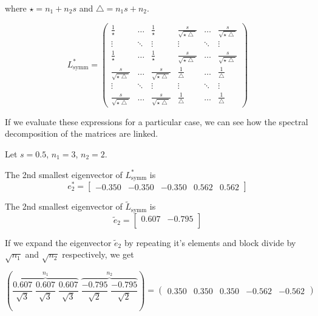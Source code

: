 where $\star = n_1 + n_2s$ and $\bigtriangleup = n_1s + n_2$.

\[ L_{\text{symm}}^* = \left(
  \begin{array}{cccccc}
    \frac{1}{\star} & \hdots & \frac{1}{\star} & \frac{s}{\sqrt{\star \bigtriangleup}} & \hdots & \frac{s}{\sqrt{\star \bigtriangleup}} \\
    \vdots & \ddots & \vdots & \vdots & \ddots & \vdots \\
    \frac{1}{\star} & \hdots & \frac{1}{\star} & \frac{s}{\sqrt{\star \bigtriangleup}} & \hdots & \frac{s}{\sqrt{\star \bigtriangleup}} \\
   \frac{s}{\sqrt{\star \bigtriangleup}} & \hdots & \frac{s}{\sqrt{\star \bigtriangleup}} & \frac{1}{\bigtriangleup}  & \hdots &  \frac{1}{\bigtriangleup} \\
    \vdots & \ddots & \vdots & \vdots & \ddots & \vdots \\
    \frac{s}{\sqrt{\star \bigtriangleup}} & \hdots & \frac{s}{\sqrt{\star \bigtriangleup}} & \frac{1}{\bigtriangleup}  & \hdots &  \frac{1}{\bigtriangleup} 
  \end{array} \right) \]

If we evaluate these expressions for a particular case, we can see how the spectral decomposition of the matrices are linked.

Let $s = 0.5$, $n_1 = 3$, $n_2 = 2$.

The 2nd smallest eigenvector of $L^*_{\text{symm}}$ is 
\[ e_2^* = \left[ 
\begin{array}{ccccc}
  -0.350& -0.350& -0.350& 0.562& 0.562  
\end{array} \right]
\]

The 2nd smallest eigenvector of $\tilde{L}_{\text{symm}}$ is 
\[ \tilde{e}_2 = \left[ 
\begin{array}{cc}
  0.607 & -0.795 \\
\end{array} \right]
\]

If we expand the eigenvector $\tilde{e}_2$ by repeating it's elements and block divide by $\sqrt{n_1}$ and $\sqrt{n_2}$ respectively, we get

\[ \left( \overbrace{\frac{0.607}{\sqrt{3}} \; \frac{0.607}{\sqrt{3}} \; \frac{0.607}{\sqrt{3}}}^{n_1} \; \overbrace{\frac{-0.795}{\sqrt{2}} \; \frac{-0.795}{\sqrt{2}}}^{n_2} \right) 
=  \left( 
\begin{array}{ccccc}
0.350& 0.350& 0.350 & -0.562& -0.562  
\end{array} \right)
\]

